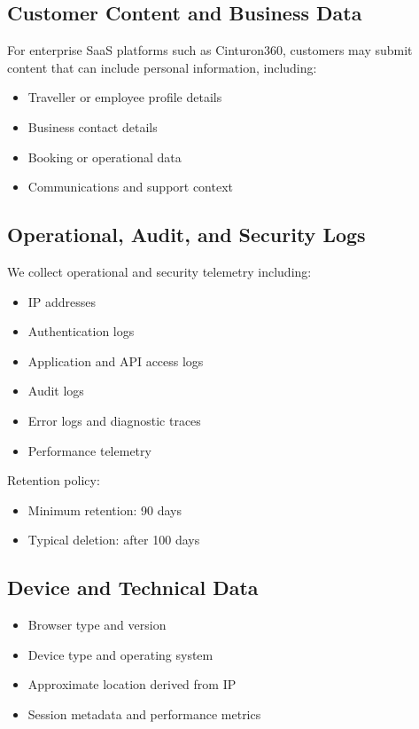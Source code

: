 \documentclass[11pt]{article}
\begin{document}
\subsection{Customer Content and Business Data}

For enterprise SaaS platforms such as Cinturon360, customers may submit content that can include personal information, including:

\begin{itemize}
\item Traveller or employee profile details
\item Business contact details
\item Booking or operational data
\item Communications and support context
\end{itemize}

\subsection{Operational, Audit, and Security Logs}

We collect operational and security telemetry including:

\begin{itemize}
\item IP addresses
\item Authentication logs
\item Application and API access logs
\item Audit logs
\item Error logs and diagnostic traces
\item Performance telemetry
\end{itemize}

Retention policy:

\begin{itemize}
\item Minimum retention: 90 days
\item Typical deletion: after 100 days
\end{itemize}

\subsection{Device and Technical Data}

\begin{itemize}
\item Browser type and version
\item Device type and operating system
\item Approximate location derived from IP
\item Session metadata and performance metrics
\end{itemize}
\end{document}
